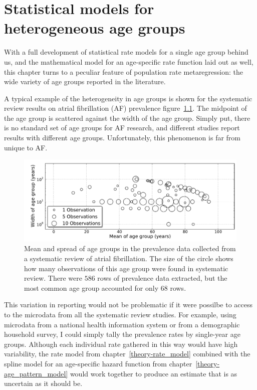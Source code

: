 \chapter{Statistical models for heterogeneous age groups}
\label{chap:age_group_model}
With a full development of statistical rate models for a single age group
behind us, and the mathematical model for an age-specific rate
function laid out as well, this chapter turns to a peculiar feature of
population rate metaregression: the wide variety of age groups reported
in the literature.

A typical example of the heterogeneity in age groups is shown for
the systematic review results on atrial fibrillation (AF)
prevalence\cite{TK_AF_report_reference}
figure~\ref{age-group-model-af-age-groups}.  The midpoint of the
age group is scattered against the width of the age group.  Simply put,
there is no standard set of age groups for AF research, and different
studies report results with different age groups. Unfortunately, this
phenomenon is far from unique to AF.

\begin{figure}[h]
\begin{center}
\includegraphics[width=\textwidth]{af_age_groups_scatter.pdf}
\end{center}
\caption[Mean and spread of age groups collected from a 
  systematic review of atrial fibrillation.]{Mean and spread 
  of age groups in the prevalence data
  collected from a systematic review of atrial fibrillation. The
  size of the circle shows how many observations of this age group
  were found in systematic review. There were
  $586$ rows of prevalence data
  extracted, but the most common age group accounted for only
  $68$ rows.}
\label{age-group-model-af-age-groups}
\end{figure}

This variation in reporting would not be problematic if it were possilbe to access
to the microdata from all the systematic review studies.  For
example, using microdata from a national health information system or
from a demographic household survey, I could simply tally the
prevalence rates by single-year age groups.  Although each individual
rate gathered in this way would have high variability, the rate model
from chapter~\ref{theory-rate_model} combined with the spline model
for an age-specific hazard function from chapter~\ref{theory-age_pattern_model} would
work together to produce an estimate that is as uncertain as it should be.

